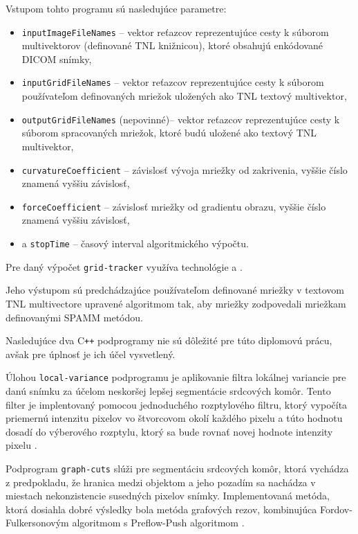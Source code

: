 Vstupom tohto programu sú nasledujúce parametre:
\begin {itemize}
\item {\texttt{inputImageFileNames} -- vektor reťazcov reprezentujúce cesty k súborom multivektorov (definované TNL knižnicou), ktoré obsahujú enkódované DICOM snímky,}
\item {\texttt{inputGridFileNames} -- vektor reťazcov reprezentujúce cesty k súborom používateľom definovaných mriežok uložených ako TNL textový multivektor,}
\item {\texttt{outputGridFileNames} (nepovinné)-- vektor reťazcov reprezentujúce cesty k súborom spracovaných mriežok, ktoré budú uložené ako textový TNL multivektor,}
\item {\texttt{curvatureCoefficient} -- závislosť vývoja mriežky od zakrivenia, vyššie číslo znamená vyššiu závislosť,}
\item {\texttt{forceCoefficient} -- závislosť mriežky od gradientu obrazu, vyššie číslo znamená vyššiu závislosť,}
\item {a \texttt{stopTime} -- časový interval algoritmického výpočtu.}
\end {itemize}

Pre daný výpočet \texttt{grid-tracker} využíva technológie  a .

Jeho výstupom sú predchádzajúce používateľom definované mriežky v textovom TNL multivectore upravené algoritmom tak, aby mriežky zodpovedali mriežkam definovanými SPAMM metódou. \newline

Nasledujúce dva C\texttt{++} podprogramy nie sú dôležité pre túto diplomovú prácu, avšak pre úplnosť je ich účel vysvetlený. \newline

Úlohou \texttt{local-variance} podprogramu je aplikovanie filtra lokálnej variancie pre danú snímku za účelom neskoršej lepšej segmentácie srdcových komôr. Tento filter je implentovaný pomocou jednoduchého rozptylového filtru, ktorý vypočíta priemernú intenzitu pixelov vo štvorcovom okolí každého pixelu a túto hodnotu dosadí do výberového rozptylu, ktorý sa bude rovnať novej hodnote intenzity pixelu \cite{master_thesis_app}.

Podprogram \texttt{graph-cuts} slúži pre segmentáciu srdcových komôr, ktorá vychádza z predpokladu, že hranica medzi objektom a jeho pozadím sa nachádza v miestach nekonzistencie susedných pixelov snímky. Implementovaná metóda, ktorá dosiahla dobré výsledky bola metóda grafových rezov, kombinujúca Fordov-Fulkersonovým algoritmom s Preflow-Push algoritmom \cite{master_thesis_app}.

